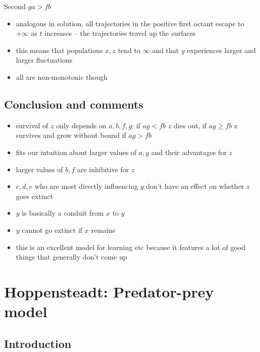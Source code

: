 \documentclass[a4paper,reqno,11pt]{article}
\begin{document}
Second $ga > fb$\newline

\begin{itemize}
    \item analogous in solution, all trajectories in the positive first octant
        escape to $+\infty$ as $t$ increases -- the trajectories travel up the
        surfaces
    \item this means that populations $x,z$ tend to $\infty$ and that $y$
        experiences larger and larger fluctuations
    \item all are non-monotonic though
\end{itemize}

\subsection{Conclusion and comments}

\begin{itemize}
    \item survival of $z$ only depends on $a,b,f,g$: if $ag<fb$ $z$ dies out,
        if $ag \ge fb$ z survives and grow without bound if $ag > fb$
    \item fits our intuition about larger values of $a,g$ and their advantages
        for $z$
    \item larger values of $b,f$ are inhibitive for $z$
    \item $c,d,e$ who are most directly influencing $y$ don't have an effect on
        whether $z$ goes extinct
    \item $y$ is basically a conduit from $x$ to $y$
    \item $y$ cannot go extinct if $x$ remains
    \item this is an excellent model for learning etc because it features a lot
        of good things that generally don't come up
\end{itemize}



\section{Hoppensteadt: Predator-prey model}

\subsection{Introduction}
\end{document}
